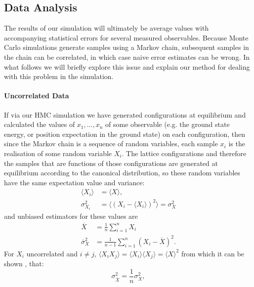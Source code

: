 \documentclass[12pt]{article}
\begin{document}
            \subsection{Data Analysis}
            The results of our simulation will ultimately be average values with accompanying statistical errors for several measured observables. Because Monte Carlo simulations generate samples using a Markov chain, subsequent samples in the chain can be correlated, in which case naive error estimates can be wrong. In what follows we will briefly explore this issue and explain our method for dealing with this problem in the simulation.

            \paragraph{Uncorrelated Data}
            If via our HMC simulation we have generated configurations at equilibrium and calculated the values of $x_1,\dots,x_n$ of some observable (e.g. the ground state energy, or position expectation in the ground state) on each configuration, then since the Markov chain is a sequence of random variables, each sample $x_i$ is the realisation of some random variable $X_i$. The lattice configurations and therefore the samples that are functions of those configurations are generated at equilibrium according to the canonical distribution, so these random variables have the same expectation value and variance:
            \begin{align}
                \langle X_i \rangle & = \langle X \rangle, \\
                \sigma^2_{X_i} & = \langle \left(X_i-\langle X_i\rangle\right)^2 \rangle = \sigma_X^2
            \end{align}
            and unbiased estimators for these values are \cite{gattringer_lang_2013}
            \begin{align}
                \overline{X} & = \frac{1}{n}\sum_{i=1}^{n} X_i \\
                \overline{\sigma}_X^2 & = \frac{1}{n-1}\sum_{i=1}^n\left(X_i-\overline{X}\right)^2.
            \end{align}
            For $X_i$ uncorrelated and $i\neq j$, $\langle X_iX_j \rangle = \langle X_i \rangle \langle X_j \rangle = \langle X \rangle^2$ from which it can be shown \cite{gattringer_lang_2013}, that:
            \begin{equation}
                \label{eq:sdRelation1}
                \sigma^2_{\overline{X}} = \frac{1}{n}\sigma^2_X,
            \end{equation}
\end{document}
